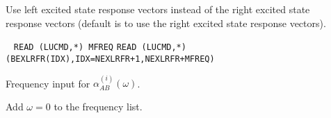 \begin{description}
\item[] 
Use left excited state response vectors instead of the right excited
state response vectors (default is to use the right excited state
response vectors).
 
\item[]  \verb| |\newline
\verb|READ (LUCMD,*) MFREQ|\newline
\verb|READ (LUCMD,*) (BEXLRFR(IDX),IDX=NEXLRFR+1,NEXLRFR+MFREQ)|

Frequency input for $\alpha^{(i)}_{AB}(\omega)$.
 
\item[] 
Add $\omega = 0$ to the frequency list.
 
\end{description}
